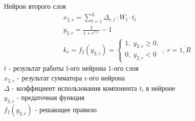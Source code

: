 \begin{frame}{Нейрон второго слоя}
    \begin{gather*}
        x_{2,r} = \sum_{l=1}^{L} \Delta_{r,l}\cdot W_{l}\cdot t_l \\
        y_{2,r} = \frac{2}{1 + e^{x_{2,r}}} - 1 \\
        k_r = f_2(y_{2,r}) = 
        \begin{cases}
            1,\; y_{2,r} \geq 0,\\
            0,\; y_{2,r} < 0
        \end{cases}
        ,\; r = \overline{1, R}
    \end{gather*}
    $\overline{t}$ - результат работы l-ого нейрона 1-ого слоя \\
    $x_{2,r}$ - результат сумматора r-ого нейрона \\
    $\Delta$ - коэффициент использования компонента $t_l$ в нейроне \\
    $y_{2,r}$ - предаточная функция \\
    $f_2(y_{2,r})$ - решающее правило \\
\end{frame}